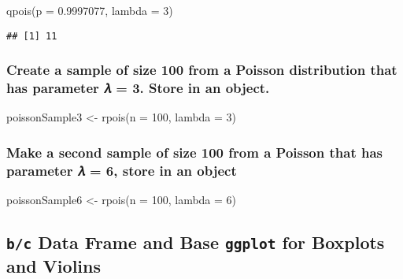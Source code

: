 \documentclass[
  12pt,
]{article}
\newenvironment{Shaded}{\begin{snugshade}}{\end{snugshade}}
\newcommand{\AttributeTok}[1]{\textcolor[rgb]{0.77,0.63,0.00}{#1}}
\newcommand{\DecValTok}[1]{\textcolor[rgb]{0.00,0.00,0.81}{#1}}
\newcommand{\FloatTok}[1]{\textcolor[rgb]{0.00,0.00,0.81}{#1}}
\newcommand{\FunctionTok}[1]{\textcolor[rgb]{0.00,0.00,0.00}{#1}}
\newcommand{\NormalTok}[1]{#1}
\newcommand{\OtherTok}[1]{\textcolor[rgb]{0.56,0.35,0.01}{#1}}
\begin{document}
\begin{Shaded}
\begin{Highlighting}[]
\FunctionTok{qpois}\NormalTok{(}\AttributeTok{p =} \FloatTok{0.9997077}\NormalTok{, }\AttributeTok{lambda =} \DecValTok{3}\NormalTok{)}
\end{Highlighting}
\end{Shaded}

\begin{verbatim}
## [1] 11
\end{verbatim}

\hypertarget{create-a-sample-of-size-100-from-a-poisson-distribution-that-has-parameter-ux1d706-3.-store-in-an-object.}{%
\subsubsection{Create a sample of size 100 from a Poisson distribution
that has parameter 𝜆 = 3. Store in an
object.}\label{create-a-sample-of-size-100-from-a-poisson-distribution-that-has-parameter-ux1d706-3.-store-in-an-object.}}

\begin{Shaded}
\begin{Highlighting}[]
\NormalTok{poissonSample3 }\OtherTok{\textless{}{-}} \FunctionTok{rpois}\NormalTok{(}\AttributeTok{n =} \DecValTok{100}\NormalTok{, }\AttributeTok{lambda =} \DecValTok{3}\NormalTok{)}
\end{Highlighting}
\end{Shaded}

\hypertarget{make-a-second-sample-of-size-100-from-a-poisson-that-has-parameter-ux1d706-6-store-in-an-object}{%
\subsubsection{Make a second sample of size 100 from a Poisson that has
parameter 𝜆 = 6, store in an
object}\label{make-a-second-sample-of-size-100-from-a-poisson-that-has-parameter-ux1d706-6-store-in-an-object}}

\begin{Shaded}
\begin{Highlighting}[]
\NormalTok{poissonSample6 }\OtherTok{\textless{}{-}} \FunctionTok{rpois}\NormalTok{(}\AttributeTok{n =} \DecValTok{100}\NormalTok{, }\AttributeTok{lambda =} \DecValTok{6}\NormalTok{)}
\end{Highlighting}
\end{Shaded}

\hypertarget{bc-data-frame-and-base-ggplot-for-boxplots-and-violins}{%
\subsection{\texorpdfstring{\texttt{b/c} Data Frame and Base
\texttt{ggplot} for Boxplots and
Violins}{b/c Data Frame and Base ggplot for Boxplots and Violins}}\label{bc-data-frame-and-base-ggplot-for-boxplots-and-violins}}
\end{document}
